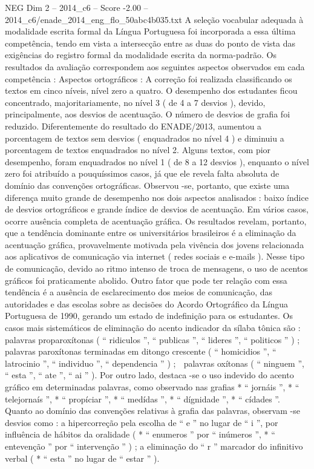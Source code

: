 \begin{textsample}{NEG Dim 2 – 2014\_c6 – Score -2.00 – 2014\_c6/enade\_2014\_eng\_flo\_50abc4b035.txt}
A seleção vocabular adequada à modalidade escrita formal da Língua Portuguesa foi incorporada a essa última competência, tendo em vista a intersecção entre as duas do ponto de vista das exigências do registro formal da modalidade escrita da norma-padrão.
Os resultados da avaliação correspondem aos seguintes aspectos observados em cada competência : Aspectos ortográficos : A correção foi realizada classificando os textos em cinco níveis, nível zero a quatro.
O desempenho dos estudantes ficou concentrado, majoritariamente, no nível 3 ( de 4 a 7 desvios ), devido, principalmente, aos desvios de acentuação.
O número de desvios de grafia foi reduzido.
Diferentemente do resultado do ENADE/2013, aumentou a porcentagem de textos sem desvios ( enquadrados no nível 4 ) e diminuiu a porcentagem de textos enquadrados no nível 2.
Alguns textos, com pior desempenho, foram enquadrados no nível 1 ( de 8 a 12 desvios ), enquanto o nível zero foi atribuído a pouquíssimos casos, já que ele revela falta absoluta de domínio das convenções ortográficas.
Observou -se, portanto, que existe uma diferença muito grande de desempenho nos dois aspectos analisados : baixo índice de desvios ortográficos e grande índice de desvios de acentuação.
Em vários casos, ocorre ausência completa de acentuação gráfica.
Os resultados revelam, portanto, que a tendência dominante entre os universitários brasileiros é a eliminação da acentuação gráfica, provavelmente motivada pela vivência dos jovens relacionada aos aplicativos de comunicação via internet ( redes sociais e e-mails ).
Nesse tipo de comunicação, devido ao ritmo intenso de troca de mensagens, o uso de acentos gráficos foi praticamente abolido.
Outro fator que pode ter relação com essa tendência é a ausência de esclarecimento dos meios de comunicação, das autoridades e das escolas sobre as decisões do Acordo Ortográfico da Língua Portuguesa de 1990, gerando um estado de indefinição para os estudantes.
Os casos mais sistemáticos de eliminação do acento indicador da sílaba tônica são :  palavras proparoxítonas ( “ ridiculos ”, “ publicas ”, “ lideres ”, “ politicos ” ) ;  palavras paroxítonas terminadas em ditongo crescente ( “ homicidios ”, “ latrocinio ”, “ individuo ”, “ dependencia ” ) ;  palavras oxítonas ( “ ninguem ”, “ esta ”, “ ate ”, “ ai ” ).
Por outro lado, destaca -se o uso indevido do acento gráfico em determinadas palavras, como observado nas grafias * “ jornáis ”, * “ telejornaís ”, * “ propíciar ”, * “ medídas ”, * “ dígnidade ”, * “ cídades ”.
Quanto ao domínio das convenções relativas à grafia das palavras, observam -se desvios como : a hipercorreção pela escolha de “ e ” no lugar de “ i ”, por influência de hábitos da oralidade ( * “ enumeros ” por “ inúmeros ”, * “ entevenção ” por “ intervenção ” ) ; a eliminação do “ r ” marcador do infinitivo verbal ( * “ esta ” no lugar de “ estar ” ).

\end{textsample}
